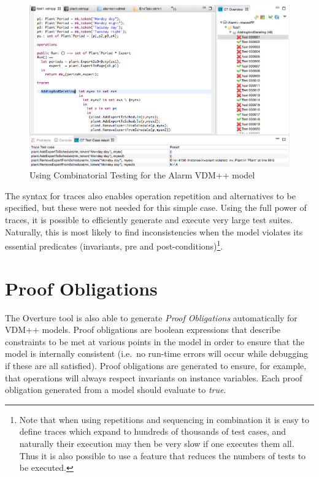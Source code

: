\begin{figure}[htbp]
\begin{center}
\includegraphics[width=4.5in]{figures/tracesalarm}
\caption{Using Combinatorial Testing for the Alarm VDM++ model\label{fig:stracesalarm}}
\end{center}
\end{figure}
%
The syntax for traces also enables operation repetition and alternatives to be specified, but these were not needed for this simple case. Using the full power of traces, it is possible to efficiently generate and execute very large test suites. Naturally, this is most likely to find inconsistencies when the model violates its essential predicates (invariants, pre and post-conditions)\footnote{Note that when using repetitions and sequencing in combination it is easy to define traces which expand to hundreds of thousands of test cases, and naturally their execution may then be very slow if one executes them all. Thus it is also possible to use a feature that reduces the numbers of tests to be executed.}.
%
\section{Proof Obligations}\label{sec:PO}
The Overture tool is also able to generate \emph{Proof Obligations} automatically for VDM++ models. Proof obligations are boolean expressions that describe constraints to be met at various points in the model in order to ensure that the model is internally consistent (i.e.\ no run-time errors will occur while debugging if these are all satisfied). Proof obligations are generated to ensure, for example, that operations will always respect invariants on instance variables. Each proof obligation generated from a model should evaluate to \emph{true}.

